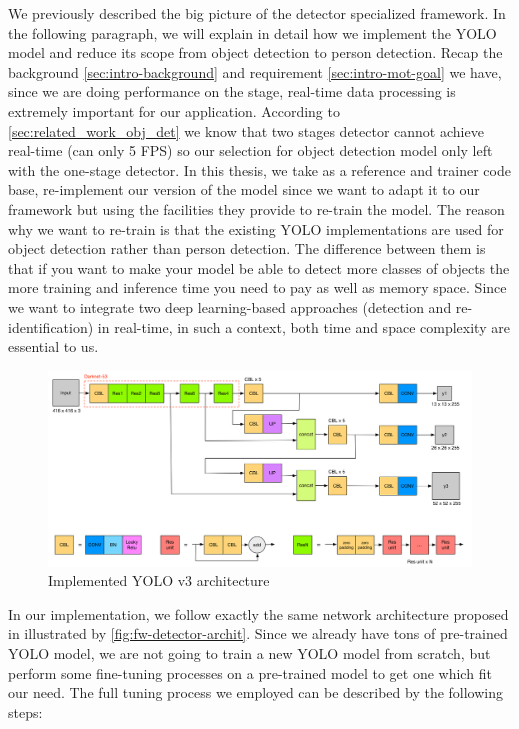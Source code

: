 We previously described the big picture of the detector specialized framework.
In the following paragraph, we will explain in detail how we implement the YOLO
model and reduce its scope from object detection to person detection.
Recap the background \autoref{sec:intro-background} and requirement
\autoref{sec:intro-mot-goal} we have, since we are doing performance on the
stage, real-time data processing is extremely important for our application.
According to \autoref{sec:related_work_obj_det} we know that
two stages detector cannot achieve real-time (can only 5 FPS) so our
selection for object detection model only left with the one-stage detector.
In this thesis, we take \cite{yolov3-keras-github} as a reference and trainer
code base, re-implement our version of the model since we want to adapt it to
our framework but using the facilities they provide to re-train the
model.
The reason why we want to re-train is that the existing YOLO implementations
are used for object detection rather than person detection.
The difference between them is that if you want to make your model be able to
detect more classes of objects the more training and inference time you need to
pay as well as memory space. Since we want to integrate two deep learning-based
approaches (detection and re-identification) in real-time, in such a context,
both time and space complexity are essential to us.

\begin{figure}
    \includegraphics[width=\linewidth]{figures/framework_detector_archit.png}
    \caption{Implemented YOLO v3 architecture}
    \label{fig:fw-detector-archit}
\end{figure}

In our implementation, we follow exactly the same network architecture proposed
in \cite{yolov3-paper-2018} illustrated by \autoref{fig:fw-detector-archit}.
Since we already have tons of pre-trained YOLO model, we are not going to train
a new YOLO model from scratch, but perform some fine-tuning processes on a
pre-trained model to get one which fit our need.
The full tuning process we employed can be described by the following steps:


